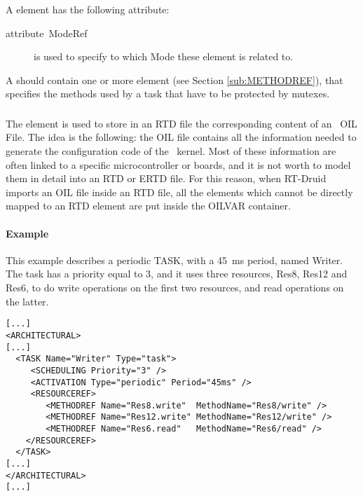 A  element has the following attribute:
\begin{description}
\item [{attribute~ModeRef}] is used to specify to which Mode these
   element is related to.
\end{description}

A  should contain one or more 
element (see Section \ref{sub:METHODREF}), that specifies the methods
used by a task that have to be protected by mutexes.


\subsubsection{}

The  element is used to store in an RTD file the
corresponding content of an \ee\ OIL File. The idea is the following:
the OIL file contains all the information needed to generate the
configuration code of the \ee\ kernel. Most of these information are
often linked to a specific microcontroller or boards, and it is not
worth to model them in detail into an RTD or ERTD file. For this
reason, when RT-Druid imports an OIL file inside an RTD file, all the
elements which cannot be directly mapped to an RTD element are put
inside the OILVAR container.


\paragraph{Example}

This example describes a periodic TASK, with a 45~ms period, named
Writer. The task has a priority equal to 3, and it uses three
resources, Res8, Res12 and Res6, to do write operations on the first
two resources, and read operations on the latter.

\begin{lstlisting}
[...]
<ARCHITECTURAL>
[...]
  <TASK Name="Writer" Type="task">
     <SCHEDULING Priority="3" />
     <ACTIVATION Type="periodic" Period="45ms" />
     <RESOURCEREF>
        <METHODREF Name="Res8.write"  MethodName="Res8/write" />
        <METHODREF Name="Res12.write" MethodName="Res12/write" />
        <METHODREF Name="Res6.read"   MethodName="Res6/read" />
    </RESOURCEREF>
  </TASK>
[...]
</ARCHITECTURAL>
[...]
\end{lstlisting}


\subsection{}
\label{sub:RESOURCE}

